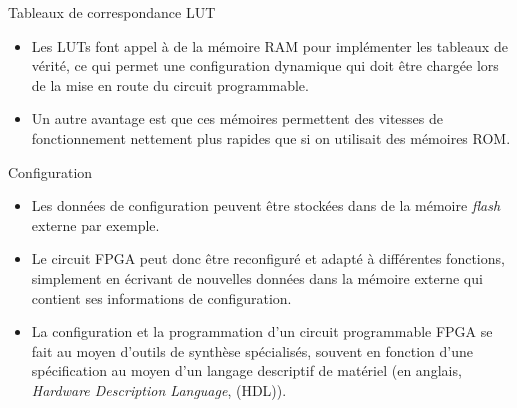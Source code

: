 \documentclass[presentation]{beamer}
\begin{document}
\begin{frame}[label={sec:org6aea787}]{Tableaux de correspondance LUT}
\begin{itemize}
\item Les LUTs font appel à de la mémoire RAM pour implémenter les tableaux de vérité, ce qui permet une configuration dynamique qui doit être chargée lors de la mise en route du circuit programmable.

\item Un autre avantage est que ces mémoires permettent des vitesses de fonctionnement nettement plus rapides que si on utilisait des mémoires ROM.
\end{itemize}
\end{frame}

\begin{frame}[label={sec:orgb3fe53e}]{Configuration}
\begin{itemize}
\item Les données de configuration peuvent être stockées dans de la mémoire \emph{flash} externe par exemple.

\item Le circuit FPGA peut donc être reconfiguré et adapté à différentes fonctions, simplement en écrivant de nouvelles données dans la mémoire externe qui contient ses informations de configuration.

\item La configuration et la programmation d'un circuit programmable FPGA se fait au moyen d'outils de synthèse spécialisés, souvent en fonction d'une spécification au moyen d'un langage descriptif de matériel (en anglais, \emph{Hardware Description Language}, (HDL)).
\end{itemize}
\end{frame}
\end{document}

